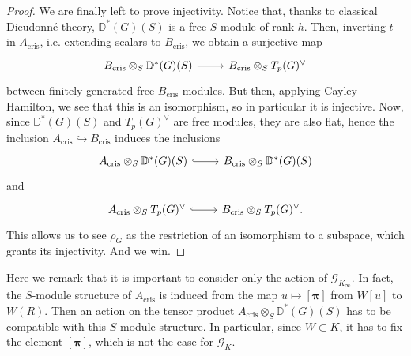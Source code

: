 \begin{proof}
	We are finally left to prove injectivity.
	Notice that, thanks to classical Dieudonné theory,
	$\mathbb{D}^*(G)(S)$ is a free $S$-module of rank $h$.
	Then, inverting $t$ in $A_{\mathrm{cris}}$, i.e. extending scalars
	to $B_{\mathrm{cris}}$, we obtain a surjective map
	\begin{equation*}
	\begin{tikzcd}[row sep = 0ex
		,/tikz/column 1/.append style={anchor=base east}
		,/tikz/column 2/.append style={anchor=base west}]
		B_{\mathrm{cris}} \otimes_S \mathbb{D}^*(G)(S)
		\arrow[r, "", rightarrow] &
		B_{\mathrm{cris}} \otimes_S T_p(G)^\vee
	\end{tikzcd}
	\end{equation*} 
	between finitely generated free $B_{\mathrm{cris}}$-modules.
	But then, applying Cayley-Hamilton, we see that this is an isomorphism,
	so in particular it is injective.
	Now, since $\mathbb{D}^*(G)(S)$ and $T_p(G)^\vee$ are free modules,
	they are also flat, hence the inclusion $A_{\mathrm{cris}} \hookrightarrow B_{\mathrm{cris}}$
	induces the inclusions
	\begin{equation*}
	\begin{tikzcd}
		A_{\mathrm{cris}} \otimes_S 
		\mathbb{D}^*(G)(S)
		\arrow[r, "", hookrightarrow] &
		B_{\mathrm{cris}} \otimes_S
		\mathbb{D}^*(G)(S)
	\end{tikzcd}
	\end{equation*}
	and
	\begin{equation*}
	\begin{tikzcd}
		A_{\mathrm{cris}} \otimes_S 
		T_p(G)^\vee
		\arrow[r, "", hookrightarrow] &
		B_{\mathrm{cris}} \otimes_S
		T_p(G)^\vee
	.\end{tikzcd}
	\end{equation*} 
	This allows us to see $\rho_G$ as the restriction of an isomorphism to a subspace,
	which grants its injectivity.
	And we win.
\end{proof}


\begin{rem}[]
	Here we remark that it is important to consider only the action of $\mathscr{G}_{K_\infty}$.
	In fact, the $S$-module structure of $A_{\mathrm{cris}}$ is induced from
	the map $u \mapsto \left[ \boldsymbol\pi \right]$ from $W[u]$ to $W(R)$.
	Then an action on the tensor product $A_{\mathrm{cris}} \otimes_S \mathbb{D}^*(G)(S)$
	has to be compatible with this $S$-module structure.
	In particular, since $W \subset K$, it has to fix the element $\left[ \boldsymbol\pi \right]$,
	which is not the case for $\mathscr{G}_K$.
\end{rem}


